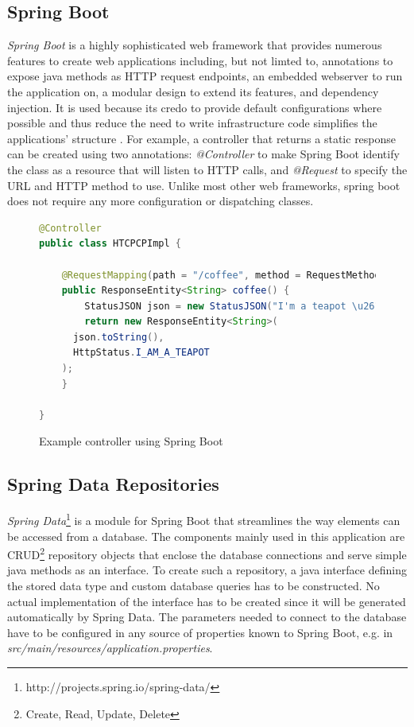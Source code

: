 \subsection{Spring Boot}
\textit{Spring Boot} is a highly sophisticated web framework that provides numerous features to create web applications including, but not limted to, annotations to expose java methods as HTTP request endpoints, an embedded webserver to run the application on, a modular design to extend its features, and dependency injection. It is used because its credo to provide default configurations where possible and thus reduce the need to write infrastructure code simplifies the applications' structure \cite[p. 6]{SpringGuide}.
For example, a controller that returns a static response can be created using two annotations:
\textit{@Controller} to make Spring Boot identify the class as a resource that will listen to HTTP calls, and \textit{@Request} to specify the URL and HTTP method to use. Unlike most other web frameworks, spring boot does not require any more configuration or dispatching classes.

\begin{figure}[h]
\begin{lstlisting}[language=Java]
@Controller
public class HTCPCPImpl {

	@RequestMapping(path = "/coffee", method = RequestMethod.GET)
	public ResponseEntity<String> coffee() {
		StatusJSON json = new StatusJSON("I'm a teapot \u2615");
		return new ResponseEntity<String>(
      json.toString(),
      HttpStatus.I_AM_A_TEAPOT
    );
	}

}
\end{lstlisting}
\caption[Example Controller]{Example controller using Spring Boot}
\end{figure}

\newpage
\subsection{Spring Data Repositories}
\textit{Spring Data}\footnote{http://projects.spring.io/spring-data/} is a module for Spring Boot that streamlines the way elements can be accessed from a database.
The components mainly used in this application are CRUD\footnote{Create, Read, Update, Delete} repository objects that enclose the database connections and serve
simple java methods as an interface. To create such a repository, a java interface defining the stored data type and custom database queries has to be constructed.
No actual implementation of the interface has to be created since it will be generated automatically by Spring Data.
The parameters needed to connect to the database have to be configured in any source of properties known to Spring Boot, e.g. in \textit{src/main/resources/application.properties}.

